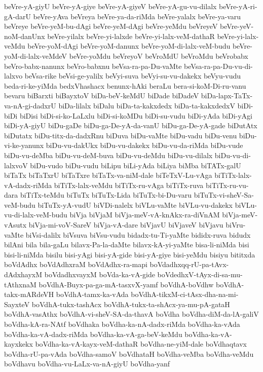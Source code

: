 {beVre-yA-giyU
beVre-yA-giye
beVre-yA-giyeV
beVre-yA-gu-vu-dilalx
beVre-yA-ri-gA-darU
beVre-yAva
beVreya
beVre-ya-da-riMda
beVre-yalalx
beVre-ya-varu
beVreye
beVre-yeM-bu-dAgi
beVre-yeM-dAgi
beVre-yeMdu
beVreyeV
beVre-yeV-noM-danUnx
beVre-yilalx
beVre-yi-lalxde
beVre-yi-lalx-veM-dathaR
beVre-yi-lalx-veMdu
beVre-yoM-dAgi
beVre-yoM-danunx
beVre-yoM-di-lalx-veM-budu
beVre-yoM-di-lalx-veMdeV
beVre-yoMdu
beVreyoV
beVroMdU
beVroMdu
beVrobabx
beVro-babx-nanunx
beVro-babxnu
beVsa-ra-pa-Du-vaMte
beVsa-ra-pa-Du-vu-di-lalxvo
beVsa-rike
beVsi-ge-yalilx
beVyi-suva
beVyi-su-vu-dakekx
beVyu-vudu
beda-ri-ke-yiMda
bedxVhashacx
benunx-hAki
beraLu
bera-si-koM-Di-ru-vanu
bevaru
biBarxti
biBayxtoV
biDa-beV-keMdU
biDade
biDadeV
biDa-lapx-TaTx-va-nA-gi-dadxrU
biDa-lilalx
biDalu
biDa-ta-kakxdedx
biDa-ta-kakxdedxV
biDi-biDi
biDisi
biDi-si-ko-LaLxlu
biDi-si-koMDu
biDi-su-vudu
biDi-yAda
biDi-yAgi
biDi-yA-giyU
biDu-gaDe
biDu-ga-De-yA-da-vanU
biDu-ga-De-yA-gade
biDutAtx
biDutatx
biDu-titx-da-dadxRnu
biDuva
biDu-vaMte
biDu-vadu
biDu-venu
biDu-vi-ke-yanunx
biDu-vu-dakUkx
biDu-vu-dakekx
biDu-vu-da-riMda
biDu-vude
biDu-vu-deMba
biDu-vu-deM-buva
biDu-vu-deMdu
biDu-vu-dilalx
biDu-vu-di-lalxvoV
biDu-vudo
biDu-vudu
biLipu
biLi-yAda
biLiya
biMba
biTATx-galU
biTaTx
biTaTxrU
biTaTxre
biTaTx-va-niM-dale
biTeTxV-Lu-vAga
biTiTx-lalx-vA-dadx-riMda
biTiTx-lalx-veMdu
biTiTx-ru-vAga
biTiTx-ruva
biTiTx-ru-vu-dara
biTiTx-teMdu
biTuTx
biTuTx-Lida
biTuTx-bi-Du-varu
biTuTx-vi-sheV-Sa-veM-budu
biTuTx-yA-vudU
biVDi-nalelx
biVLu-vaMte
biVLu-vu-dakekx
biVLu-vu-di-lalx-veM-budu
biVja
biVjaM
biVja-meV-vA-knAkx-ra-diVnAM
biVja-meV-vAsutx
biVja-mi-voV-SareV
biVja-vA-dare
biVjavU
biVjaveV
biVjavu
biVru-vaMte
biVsi-dalilx
biVsuva
biVsu-vudu
bidadx-tu-Ti-yaMte
bididx-ruva
bidudx
bilAni
bila
bila-gaLu
bilavx-Pa-la-daMte
bilavx-kA-yi-yaMte
bisa-li-niMda
bisi
bisi-li-niMda
bisilu
bisi-yAgi
bisi-yA-gide
bisi-yA-giye
bisi-yeMdu
bisiyu
bititxda
boVdAdhx
boVdAdhxraM
boVdAdhx-ra-mapi
boVdadhxqq-rU-pa-tAvx-dAdxhayxM
boVdadhxvayxM
boVda-ka-vA-gide
boVdedhxV-tAyx-di-sa-mu-tAthxnaM
boVdhA-Buyx-pa-ga-mA-tasxvX-yamf
boVdhA-boVdhw
boVdhA-takx-mARdeVH
boVdhA-tamx-ka-vAda
boVdhA-tikxM-ci-tAsx-dha-na-mi-SayxteV
boVdhA-tukx-tashAcx
boVdhA-tukx-ta-shAcx-ya-mu-pA-gataH
boVdhA-vasAthx
boVdhA-vi-sheV-SA-da-thavA
boVdha
boVdha-diM-da-lA-galiV
boVdha-kA-ra-NAtf
boVdhaka
boVdha-ka-nA-dadx-riMda
boVdha-ka-vAda
boVdha-ka-vA-dadx-riMda
boVdha-ka-vA-ga-beV-keMdu
boVdha-ka-vA-kayxkekx
boVdha-ka-vA-kayx-veM-dathaR
boVdha-ne-yiM-dale
boVdhaqtavx
boVdha-rU-pa-vAda
boVdha-samoV
boVdhataH
boVdha-veMba
boVdha-veMdu
boVdhavu
boVdha-vu-LaLx-va-nA-giyU
boVdha-yanf
}

